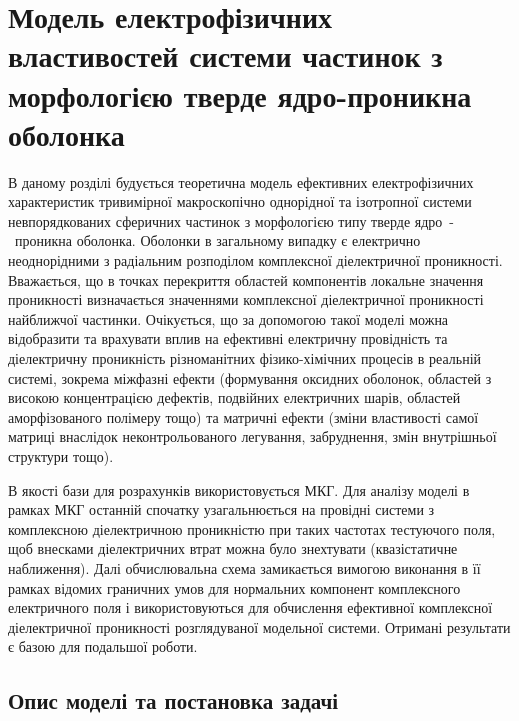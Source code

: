 \documentclass[14pt,twoside]{vakthesis}
\begin{document}
\chapter{Модель  електрофізичних властивостей системи частинок з морфологією тверде ядро-проникна оболонка}\label{sec:core-shell}

В даному розділі будується теоретична модель ефективних електрофізичних характеристик тривимірної макроскопічно однорідної та ізотропної системи невпорядкованих сферичних частинок з морфологією типу тверде ядро~-~проникна оболонка.
Оболонки в загальному випадку є електрично неоднорідними з радіальним розподілом комплексної діелектричної проникності. Вважається, що в точках перекриття областей компонентів локальне значення  проникності визначається значеннями комплексної діелектричної проникності найближчої частинки.
Очікується, що за допомогою такої моделі можна  відобразити та врахувати вплив на ефективні електричну провідність та діелектричну проникність різноманітних фізико-хімічних процесів в реальній системі, зокрема міжфазні ефекти (формування оксидних оболонок, областей з високою концентрацією дефектів, подвійних електричних шарів, областей аморфізованого полімеру тощо) та матричні ефекти (зміни властивості самої матриці внаслідок неконтрольованого легування, забруднення, змін внутрішньої структури тощо).

В якості бази для розрахунків використовується МКГ. Для аналізу моделі в рамках МКГ останній спочатку узагальнюється на провідні системи з комплексною діелектричною проникністю при таких частотах тестуючого поля, щоб внесками діелектричних втрат можна було знехтувати (квазістатичне наближення). Далі обчислювальна схема замикається вимогою виконання в її рамках відомих граничних умов для нормальних компонент комплексного електричного поля і використовуються для обчислення ефективної комплексної діелектричної проникності  розглядуваної модельної системи. Отримані результати є базою для подальшої роботи.

\vspace{40pt}

\section{Опис моделі та постановка задачі}
\end{document}
